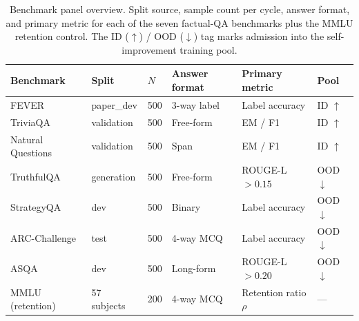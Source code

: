 \begin{table}[t]
\centering
\caption{Benchmark panel overview. Split source, sample count per cycle, answer format, and primary metric for each of the seven factual-QA benchmarks plus the MMLU retention control. The ID ($\uparrow$) / OOD ($\downarrow$) tag marks admission into the self-improvement training pool.}
\label{tab:benchmark-overview}
\begin{tabular}{llllll}
\toprule
Benchmark & Split & $N$ & Answer format & Primary metric & Pool \\
\midrule
FEVER               & paper\_dev & 500 & 3-way label    & Label accuracy        & ID $\uparrow$ \\
TriviaQA            & validation & 500 & Free-form      & EM / F1               & ID $\uparrow$ \\
Natural Questions   & validation & 500 & Span           & EM / F1               & ID $\uparrow$ \\
TruthfulQA          & generation & 500 & Free-form      & ROUGE-L $> 0.15$      & OOD $\downarrow$ \\
StrategyQA          & dev        & 500 & Binary         & Label accuracy        & OOD $\downarrow$ \\
ARC-Challenge       & test       & 500 & 4-way MCQ      & Label accuracy        & OOD $\downarrow$ \\
ASQA                & dev        & 500 & Long-form      & ROUGE-L $> 0.20$      & OOD $\downarrow$ \\
MMLU (retention)    & 57 subjects& 200 & 4-way MCQ      & Retention ratio $\rho$ & --- \\
\bottomrule
\end{tabular}
\end{table}

